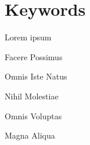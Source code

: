 \section*{Keywords}

{\large %

\noindent Lorem ipsum

\noindent Facere Possimus

\noindent Omnis Iste Natus

\noindent Nihil Molestiae

\noindent Omnis Voluptas

\noindent Magna Aliqua

}

\vfill

\cleardoublepage



\pagestyle{plain}



\def\contentsname{Índice}
\tableofcontents
\newpage

\listoffigures
\newpage

\listoftables


\cleardoublepage


